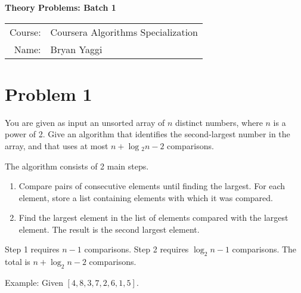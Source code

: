 \documentclass[10pt]{article}
\begin{document}
\begin{center}
{\Large \textbf{Theory Problems: Batch 1}}

\begin{tabular}{rl}
\\
Course: & Coursera Algorithms Specialization \\
Name: & Bryan Yaggi
\end{tabular}
\end{center}

\section*{\normalsize Problem 1}

You are given as input an unsorted array of $n$ distinct numbers, where $n$ is a power of 2. Give an algorithm that identifies the second-largest number in the array, and that uses at most $n + \log⁡_2 n - 2$ comparisons.
\bigskip

The algorithm consists of 2 main steps.

\begin{enumerate}
	\item Compare pairs of consecutive elements until finding the largest. For each element, store a list containing elements with which it was compared.
	\item Find the largest element in the list of elements compared with the largest element. The result is the second largest element.
\end{enumerate}

Step 1 requires $n - 1$ comparisons. Step 2 requires $\log_2 n - 1$ comparisons. The total is $n + \log_2 n - 2$ comparisons.
\smallskip

Example: Given $[4, 8, 3, 7, 2, 6, 1, 5]$.
\end{document}

